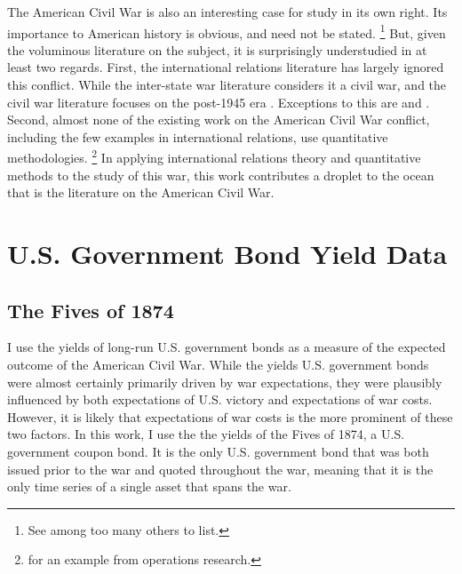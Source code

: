 The American Civil War is also an interesting case for study in its own right.
Its importance to American history is obvious, and need not be stated.%
\footnote{See \textcite{McPherson2003} among too many others to list.}
But, given the voluminous literature on the subject, it is surprisingly understudied in at least two regards. %
First, the international relations literature has largely ignored this conflict.
While the inter-state war literature considers it a civil war, and the civil war literature focuses on the post-1945 era \parencites[140-141]{Reiter2009}[2]{Poast2012}. %
Exceptions to this are \textcite{Reiter2009} and \textcite{Poast2012}.
Second, almost none of the existing work on the American Civil War conflict, including the few examples in international relations, use quantitative methodologies.%
\footnote{\textcite{Weiss1966} for an example from operations research.}
In applying international relations theory and quantitative methods to the study of this war, this work contributes a droplet to the ocean that is the literature on the American Civil War.



\section{U.S. Government Bond Yield Data}
\label{sec:why-prices-study}



\subsection{The Fives of 1874}
\label{sec:5s-1874}

I use the yields of long-run U.S. government bonds as a measure of the expected outcome of the American Civil War.
While the yields U.S. government bonds were almost certainly primarily driven by war expectations, they were plausibly influenced by both expectations of U.S. victory and expectations of war costs.
However, it is likely that expectations of war costs is the more prominent of these two factors.
In this work, I use the the yields of the Fives of 1874, a U.S. government coupon bond.
It is the only U.S. government bond that was both issued prior to the war and quoted throughout the war, meaning that it is the only time series of a single asset that spans the war.

